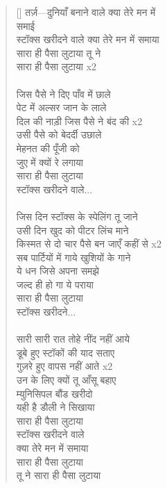 \begin{verse}[\versewidth]\texthindi{
तर्ज़—दुनियाँ बनाने वाले क्या तेरे मन में\\
समाई\\
स्टॉक्स खरीदने वाले क्या तेरे मन में समाया\\
सारा ही पैसा लुटाया तू ने\\
सारा ही पैसा लुटाया
}x\texthindi{2\\
\\
जिस पैसे ने दिए पाँव में छाले\\
पेट में अल्सर जान के लाले\\
दिल की नाड़ी जिस पैसे ने बंद की x2\\
उसी पैसे को बेदर्दी उछाले\\
मेहनत की पूँजी को\\
जुए में क्यों रे लगाया\\
सारा ही पैसा लुटाया\\
स्टॉक्स खरीदने वाले...\\
\\
जिस दिन स्टॉक्स के स्पेलिंग तू जाने\\
उसी दिन खुद को पीटर लिंच माने\\
किस्मत से दो चार पैसे बन जाएँ कहीं से x2\\
सब पार्टियों में गाये खुशियों के गाने\\
ये धन जिसे अपना समझे\\
जल्द ही हो गा ये पराया\\
सारा ही पैसा लुटाया\\
स्टॉक्स खरीदने...\\
\\
सारी सारी रात तोहे नींद नहीं आये\\
डूबे हुए स्टॉकों की याद सताए\\
गुज़रे हुए वापस नहीं आते x2\\
उन के लिए क्यों तू आँसू बहाए\\
म्युनिसिपल बौंड खरीदो\\
यही है डौली ने सिखाया\\
सारा ही पैसा लुटाया\\
स्टॉक्स खरीदने वाले\\
क्या तेरे मन में समाया\\
सारा ही पैसा लुटाया\\
तू ने सारा ही पैसा लुटाया
}\end{verse} 

